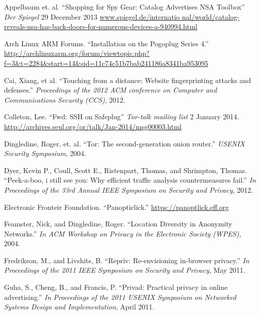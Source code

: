 \documentclass[conference]{IEEEtran}
\begin{document}
\begin{thebibliography}{1}

 Appelbaum et. al. ``Shopping for Spy Gear: Catalog Advertises 
NSA Toolbox'' \emph{Der Spiegel} 29 December 2013 \url{www.spiegel.de/internatio
nal/world/catalog-reveals-nsa-has-back-doors-for-numerous-devices-a-940994.html}

 Arch Linux ARM Forums. ``Installation on the Pogoplug Series 4.'' \url{http://archlinuxarm.org/forum/viewtopic.php?f=3&t=2284&start=14&sid=11c74c51b7bab241186a8341ba953095}


 Cai, Xiang, et al. ``Touching from a distance: Website fingerprinting attacks and defenses.'' \emph{Proceedings of the 2012 ACM conference on Computer and Communications Security (CCS)}, 2012.

 Colleton, Lee. ``Fwd: SSH on Safeplug'' \emph{Tor-talk mailing list} 2 January 2014. \url{http://archives.seul.org/or/talk/Jan-2014/msg00003.html}

 Dingledine, Roger, et. al. ``Tor: The second-generation onion router.'' \emph{USENIX Security Symposium}, 2004.

 Dyer, Kevin P., Coull, Scott E., Ristenpart, Thomas, and Shrimpton, Thomas.  ``Peek-a-boo, i still see you: Why efficient traffic analysis countermeasures fail.'' \emph{In Proceedings of the 33rd Annual IEEE Symposium on Security and Privacy}, 2012.

 Electronic Fronteir Foundation. ``Panopticlick.'' \url{https://panoptlick.eff.org}

 Feamster, Nick, and Dingledine, Roger.  ``Location Diversity in Anonymity Networks.''  \emph{In ACM Workshop on Privacy in the Electronic Society (WPES)}, 2004.

 Fredrikson, M., and Livshits, B. ``Repriv: Re-envisioning in-browser privacy.'' \emph{In Proceedings of the 2011 IEEE Symposium on Security and Privacy}, May 2011.

 Guha, S., Cheng, B., and Francis, P. ``Privad: Practical privacy in online advertising.'' \emph{In Proceedings of the 2011 USENIX Symposium on Networked Systems Design and Implementation}, April 2011.


\end{thebibliography}
\end{document}
